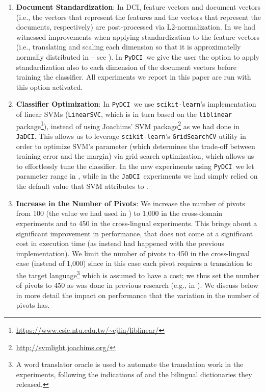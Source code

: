 \documentclass{article}
\newcommand{\jadci}{\texttt{JaDCI}}
\newcommand{\pydci}{\texttt{PyDCI}}
\begin{document}
\begin{enumerate}

\item \label{item:standardization} \textbf{Document Standardization}:
  In DCI, feature vectors and document vectors (i.e., the vectors that
  represent the features and the vectors that represent the documents,
  respectively) are post-processed via L2-normalization. In
  \citep{Moreo:2016fg} we had witnessed improvements when applying
  standardization to the feature vectors (i.e., translating and
  scaling each dimension so that it is approximatelly normally
  distributed in  -- see \citep[p.\
  144]{Moreo:2016fg}). In \pydci\ we give the user the option to apply
  standardization also to each dimension of the document vectors
  before training the classifier.
All experiments we report in this paper are run with this option
  activated.

\item \label{item:optimization} \textbf{Classifier Optimization}: In
  \pydci\ we use \texttt{scikit-learn}'s implementation of linear SVMs
  (\texttt{LinearSVC}, which is in turn based on the
  \texttt{liblinear}
  package\footnote{\url{https://www.csie.ntu.edu.tw/~cjlin/liblinear/}}),
  instead of using Joachims' SVM
  package\footnote{\url{http://svmlight.joachims.org/}} as we had done
  in \jadci.  This allows us to leverage \texttt{scikit-learn}'s
  \texttt{GridSearchCV} utility in order to optimize SVM's 
  parameter (which determines the trade-off between training error and
  the margin) via grid search optimization, which allows us to
  effortlessly tune the classifier. In the new experiments using
  \pydci\ we let parameter  range in ,
  while in the \jadci\ experiments we had simply relied on the default
  value that SVM attributes to .


\item \label{item:pivots} \textbf{Increase in the Number of Pivots}:
  We increase the number of pivots from 100 (the value we had used in
  \citep{Moreo:2016fg}) to 1,000 in the cross-domain experiments and
  to 450 in the cross-lingual experiments. This brings about a
  significant improvement in performance, that does not come at a
  significant cost in execution time (as instead had happened with the
  previous implementation).  We limit the number of pivots to 450 in
  the cross-lingual case (instead of 1,000) since in this case each
  pivot requires a translation to the target language\footnote{A word
  translator oracle is used to automate the translation work in the
  experiments, following the indications of
  \citep{Prettenhofer:2010ys} and the bilingual dictionaries they
  released.} which is assumed to have a cost; we thus set the number
  of pivots to 450 as was done in previous research (e.g., in
  \citep{Prettenhofer:2010ys}). We discuss below in more detail the
  impact on performance that the variation in the number of pivots
  has.

\end{enumerate}
\end{document}
